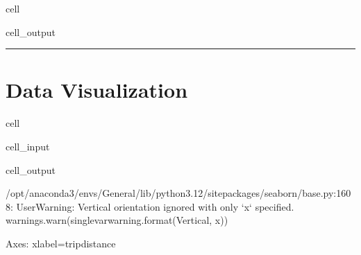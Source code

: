 \documentclass[letterpaper,10pt,english]{sphinxmanual}
\begin{document}
\begin{sphinxuseclass}{cell}
\begin{sphinxuseclass}{cell_output}
\end{sphinxuseclass}
\end{sphinxuseclass}

\bigskip\hrule\bigskip



\section{Data Visualization}
\label{\detokenize{Automatidata_EDA:data-visualization}}
\sphinxAtStartPar
{}

\begin{sphinxuseclass}{cell}
\begin{sphinxuseclass}{cell_input}
\begin{sphinxVerbatim}[commandchars=\\\{\}]
\PYG{p}{[}\PYG{p}{]}  
\end{sphinxVerbatim}

\end{sphinxuseclass}
\begin{sphinxuseclass}{cell_output}
\begin{sphinxVerbatim}[commandchars=\\\{\}]
/opt/anaconda3/envs/General/lib/python3.12/site\PYGZhy{}packages/seaborn/\PYGZus{}base.py:1608: UserWarning: Vertical orientation ignored with only `x` specified.
  warnings.warn(single\PYGZus{}var\PYGZus{}warning.format(\PYGZdq{}Vertical\PYGZdq{}, \PYGZdq{}x\PYGZdq{}))
\end{sphinxVerbatim}

\begin{sphinxVerbatim}[commandchars=\\\{\}]
\PYGZlt{}Axes: xlabel=\PYGZsq{}trip\PYGZus{}distance\PYGZsq{}\PYGZgt{}
\end{sphinxVerbatim}

\noindent{}

\end{sphinxuseclass}
\end{sphinxuseclass}
\end{document}
